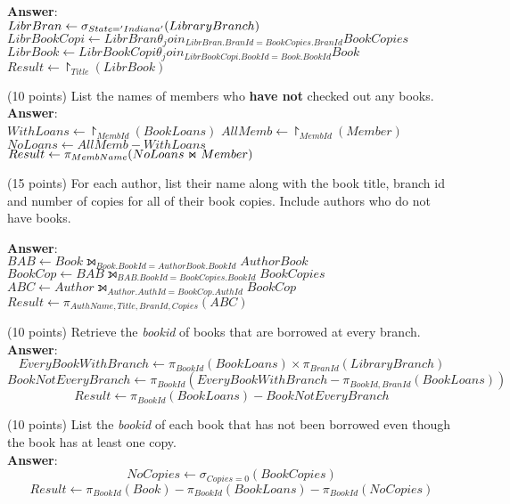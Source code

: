 \begin{questions}
\begin{choices}
    \textbf{Answer}:\\
	$ LibrBran \leftarrow \sigma_{State='Indiana' } (LibraryBranch) $
	$ LibrBookCopi \leftarrow  LibrBran \theta_join_{LibrBran.BranId =BookCopies.BranId } BookCopies $
	$ LibrBook \leftarrow  LibrBookCopi \theta_join_{LibrBookCopi.BookId =Book.BookId } Book $
    $ Result \leftarrow \project_{Title} (LibrBook)$
	
	\choice(10 points) List the names of members who \textbf{have not} checked out any books. \\
	\textbf{Answer}:\\
	$ WithLoans \leftarrow \project_{MembId} (BookLoans)$
	$ AllMemb \leftarrow \project_{MembId} (Member) $
	$ NoLoans \leftarrow AllMemb - WithLoans $
    $ Result \leftarrow \pi_{MembName} (NoLoans \Join Member) $
	
	\choice(15 points) For each author, list their name along with the book title, branch id and  number of copies for all of their book copies. Include authors who do not have books.  
	
    \textbf{Answer}:\\
	$BAB \leftarrow Book \leftouterjoin_{Book.BookId =AuthorBook.BookId } AuthorBook $
	$BookCop \leftarrow BAB \leftouterjoin_{BAB.BookId =BookCopies.BookId } BookCopies $
	$ABC \leftarrow Author \leftouterjoin_{Author.AuthId =BookCop.AuthId } BookCop $
	$Result \leftarrow \pi_{AuthName, Title, BranId, Copies} (ABC)$
	
	
	\choice(10 points) Retrieve the \textit{bookid} of books that are borrowed at every branch. \\
    \textbf{Answer}:\\
    $$EveryBookWithBranch \leftarrow \pi_{BookId}(BookLoans) \times \pi_{BranId}(LibraryBranch)$$
    $$BookNotEveryBranch \leftarrow \pi_{BookId}(EveryBookWithBranch - \pi_{BookId, BranId}(BookLoans))$$
    $$Result \leftarrow \pi_{BookId}(BookLoans) - BookNotEveryBranch$$
    
   
	
	\choice(10 points) List the \textit{bookid} of each book that has not been borrowed even though the book has at least one copy. \\
    \textbf{Answer}:\\
     $$NoCopies \leftarrow \sigma_{Copies=0}(BookCopies)$$
     $$Result \leftarrow \pi_{BookId}(Book) - \pi_{BookId}(BookLoans) - \pi_{BookId}(NoCopies)$$
    

\end{choices}
\end{questions}
